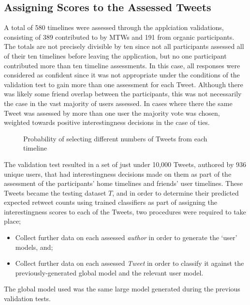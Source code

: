 \subsection{Assigning Scores to the Assessed Tweets}
A total of 580 timelines were assessed through the applciation validations, consisting of 389 contributed to by MTWs and 191 from organic participants. The totals are not precisely divisible by ten since not all participants assessed all of their ten timelines before leaving the application, but no one participant contributed more than ten timeline assessments. In this case, all responses were considered as confident since it was not appropriate under the conditions of the validation test to gain more than one assessment for each Tweet. Although there was likely some friend overlap between the participants, this was not necessarily the case in the vast majority of users assessed. In cases where there the same Tweet was assessed by more than one user the majority vote was chosen, weighted towards positive interestingness decisions in the case of ties. 

\begin{figure}[h]
\centering
{}
\caption{Probability of selecting different numbers of Tweets from each timeline}
\label{fig:num_tweets_selected}

\end{figure}
The validation test resulted in a set of just under 10,000 Tweets, authored by 936 unique users, that had interestingness decisions made on them as part of the assessment of the participants' home timelines and friends' user timelines. These Tweets became the testing dataset $T$, and in order to determine their predicted expected retweet counts using trained classifiers as part of assigning the interestingness scores to each of the Tweets, two procedures were required to take place;
\begin{itemize}
    \item Collect further data on each assessed \textit{author} in order to generate the `user' models, and;
    \item Collect further data on each assessed \textit{Tweet} in order to classify it against the previously-generated global model and the relevant user model.
\end{itemize}
The global model used was the same large model generated during the previous validation tests.

